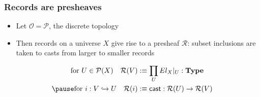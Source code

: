 \documentclass[tikz, 12pt]{beamer}
\begin{document}
\begin{frame}
  \frametitle{Records are presheaves}\pause

  \begin{itemize}
    \item Let $\mathcal{O} = \mathcal{P}$, the discrete topology\pause
    \item Then records on a universe $X$ give rise to a presheaf $\mathcal{R}$: subset inclusions are taken to casts from larger to smaller records
  \end{itemize}
  \pause

  \[
    \begin{aligned}
      \text{for } U\in\mathcal{P}(X)\quad \mathcal{R}(V) &:\equiv \prod_U El_X|_U : \mathbf{Type}\\ \pause
      \text{for } i : V\hookrightarrow U\quad \mathcal{R}(i) &:\equiv \mathsf{cast} : \mathcal{R}(U)\to\mathcal{R}(V)
    \end{aligned}
  \]
\end{frame}
\end{document}
